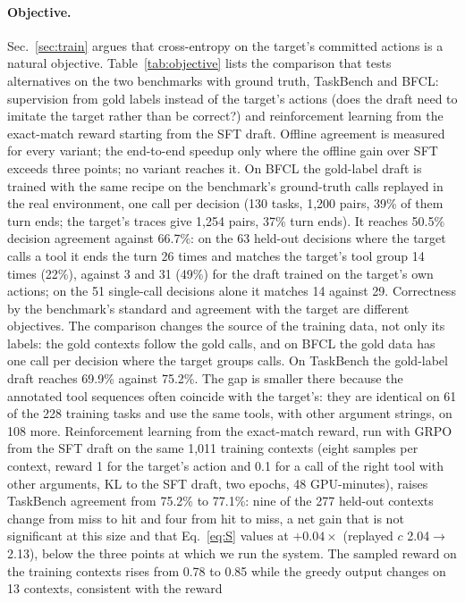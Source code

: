 \paragraph{Objective.}
Sec.~\ref{sec:train} argues that cross-entropy on the target's committed actions is a natural
objective. Table~\ref{tab:objective} lists the comparison that tests alternatives on the two benchmarks with
ground truth, TaskBench and BFCL: supervision from gold labels instead of the target's actions (does the
draft need to imitate the target rather than be correct?) and reinforcement learning from the exact-match
reward starting from the SFT draft. Offline agreement is measured for every variant; the end-to-end speedup
only where the offline gain over SFT exceeds three points; no variant reaches it. On BFCL the gold-label draft is trained with the
same recipe on the benchmark's ground-truth calls replayed in the real environment, one call per decision
(130 tasks, 1{,}200 pairs, 39\% of them turn ends; the target's traces give 1{,}254 pairs, 37\% turn ends).
It reaches 50.5\% decision agreement against 66.7\%: on the 63 held-out decisions where the target calls
a tool it ends the turn 26 times and matches the target's tool group 14 times (22\%), against 3 and
31 (49\%) for the draft trained on the target's own actions; on the 51 single-call decisions alone it matches
14 against 29. Correctness by the benchmark's standard and agreement with the target are different
objectives. The comparison changes the source of the training data, not only its labels: the gold contexts
follow the gold calls, and on BFCL the gold data has one call per decision where the target groups calls.
On TaskBench the gold-label draft reaches 69.9\% against 75.2\%. The gap is smaller there because
the annotated tool sequences often coincide with the target's: they are identical on 61 of the 228 training
tasks and use the same tools, with other argument strings, on 108 more. Reinforcement learning from the exact-match reward, run with GRPO from the SFT draft on the same
1{,}011 training contexts (eight samples per context, reward 1 for the target's action and 0.1 for a call of
the right tool with other arguments, KL to the SFT draft, two epochs, 48 GPU-minutes), raises TaskBench
agreement from 75.2\% to 77.1\%: nine of the 277 held-out contexts change from miss to hit and four from hit
to miss, a net gain that is not significant at this size and that Eq.~\ref{eq:S} values at $+0.04\times$
(replayed $c$ 2.04$\to$2.13), below the three points at which we run the system. The sampled reward on the
training contexts rises from 0.78 to 0.85 while the greedy output changes on 13 contexts, consistent with the reward
